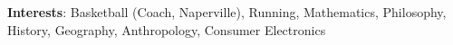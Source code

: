 \documentclass[letterpaper,11pt]{article}
\makeatletter
\newcommand{\resumeItem}[1]{
  \item\small{#1}
    {\vspace{-2pt}}
  }
\newcommand{\resumeSubheading}[4]{
  \vspace{-2pt}\item
    \begin{tabular*}{0.97\textwidth}[t]{l@{\extracolsep{\fill}}r}
      \vspace{0pt}
      \textbf{\small#1} & \small#2 \\
      \vspace{0pt}
      \textit{\small#3} & \textit{\small #4} \\
    \end{tabular*}\vspace{-2pt}
}
\newcommand{\resumeSubHeadingListEnd}{\end{itemize}}
\newcommand{\resumeItemListStart}{\begin{itemize}[leftmargin=*]\vspace{-2pt}}
\newcommand{\resumeItemListEnd}{\end{itemize}\vspace{-5pt}}
\makeatother
\begin{document}





\vspace{10pt}
\footnotesize\textbf{Interests}{: Basketball (Coach, Naperville), Running, Mathematics, Philosophy, History, Geography, Anthropology, Consumer Electronics}
\end{document}
